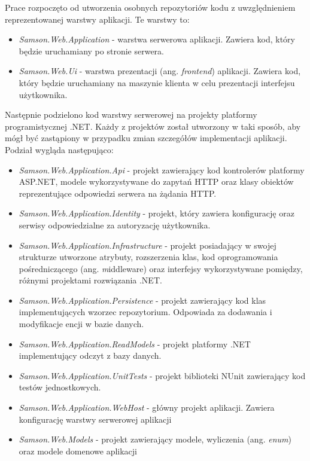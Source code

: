 \documentclass[a4paper,twoside,12pt]{book}
\newcommand{\obcy}[1]{\emph{#1}}
\newcommand{\ang}[1]{{\selectlanguage{british}\obcy{#1}}}
\begin{document}
	Prace rozpoczęto od utworzenia osobnych repozytoriów kodu z uwzględnieniem reprezentowanej warstwy aplikacji. Te warstwy to:
	\begin{itemize}
		\item \textit{Samson.Web.Application} - warstwa serwerowa aplikacji. Zawiera kod, który będzie uruchamiany po stronie serwera.
		\item \textit{Samson.Web.Ui} - warstwa prezentacji (ang. \ang{frontend}) aplikacji. Zawiera kod, który będzie uruchamiany na maszynie klienta w celu prezentacji interfejsu użytkownika.
	\end{itemize}

	Następnie podzielono kod warstwy serwerowej na projekty platformy programistycznej .NET. Każdy z projektów został utworzony w taki sposób, aby mógł być zastąpiony w przypadku zmian szczegółów implementacji aplikacji. Podział wygląda następująco:
	\begin{itemize}
		\item \textit{Samson.Web.Application.Api} - projekt zawierający kod kontrolerów platformy ASP.NET, modele wykorzystywane do zapytań HTTP oraz klasy obiektów reprezentujące odpowiedzi serwera na żądania HTTP.
		\item \textit{Samson.Web.Application.Identity} - projekt, który zawiera konfigurację oraz serwisy odpowiedzialne za autoryzację użytkownika.
		\item \textit{Samson.Web.Application.Infrastructure} - projekt posiadający w swojej strukturze utworzone atrybuty, rozszerzenia klas, kod oprogramowania pośredniczącego (ang. \ang middleware) oraz interfejsy wykorzystywane pomiędzy, różnymi projektami rozwiązania .NET.
		\item \textit{Samson.Web.Application.Persistence} - projekt zawierający kod klas implementujących wzorzec repozytorium. Odpowiada za dodawania i modyfikacje encji w bazie danych.
		\item \textit{Samson.Web.Application.ReadModels} - projekt platformy .NET implementujący odczyt z bazy danych.
		\item \textit{Samson.Web.Application.UnitTests} - projekt biblioteki NUnit zawierający kod testów jednostkowych.
		\item \textit{Samson.Web.Application.WebHost} - główny projekt aplikacji. Zawiera konfigurację warstwy serwerowej aplikacji
		\item \textit{Samson.Web.Models} - projekt zawierający modele, wyliczenia (ang. \ang{enum}) oraz modele domenowe aplikacji
	\end{itemize}
	
\end{document}
